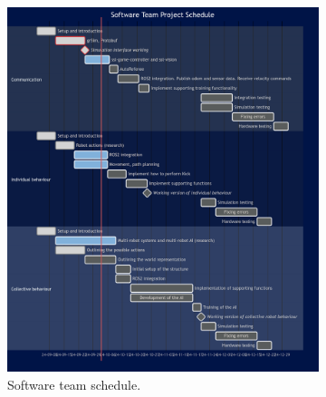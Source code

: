 \begin{figure}[H]
    \centering
    \begin{subfigure}[b]{0.55\textwidth}
       \includegraphics[width=0.95\linewidth]{images/DVA490_software_team_project_schedule.png}
       \caption{Software team schedule.}
       \label{fig:software_schedule} 
    \end{subfigure}
    \hfill
    \begin{subfigure}[b]{0.55\textwidth}

\end{subfigure}
\end{figure}
